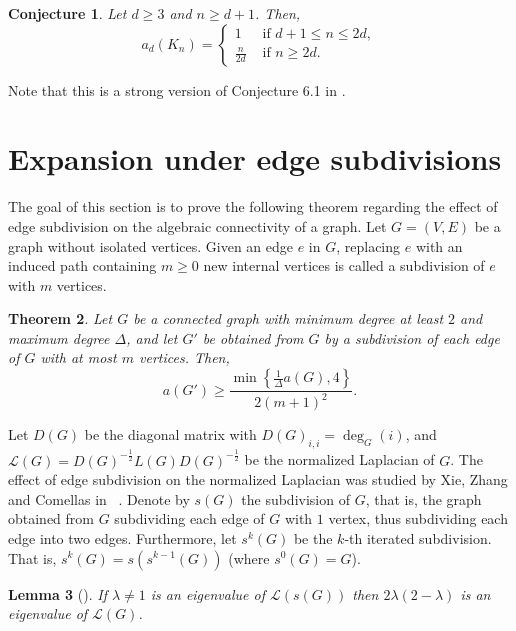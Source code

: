 \documentclass[a4paper,11pt]{article}
\theoremstyle{plain}
\newtheorem{theorem}{\bf Theorem}[section]
\newtheorem{conjecture}[theorem]{\bf Conjecture}
\newtheorem{lemma}[theorem]{\bf Lemma}
\theoremstyle{definition}
\begin{document}
\begin{conjecture}\label{conj:complete}
Let $d\geq 3$ and $n\geq d+1$. Then,
\[
a_d(K_n)=\begin{cases}
1 & \text{ if }  d+1\leq n\leq 2d,\\
\frac{n}{2d} & \text{ if } n\geq 2d.
\end{cases}
\]
\end{conjecture}
Note that this is a strong version of Conjecture 6.1 in \cite{lew2022d}.






\section{Expansion under edge subdivisions}\label{sec:subdivisions}
The goal of this section is to prove the following theorem regarding the effect of edge subdivision on the algebraic connectivity of a graph. Let $G=(V,E)$ be a graph without isolated vertices. Given an edge $e$ in  $G$, replacing $e$ with an induced path containing $m\ge 0$ new internal vertices is called a subdivision of $e$ with $m$ vertices. 

\begin{theorem}\label{thm:subdivided_spectral_gap}
Let $G$ be a connected graph with minimum degree at least $2$ and maximum degree $\Delta$, and let $G'$ be obtained from $G$ by a subdivision of each edge of $G$ with at most $m$ vertices. Then,
\[
a(G')\geq \frac{\min\left\{\frac{1}{\Delta}a(G),4\right\}}{2 (m+1)^2}.
\]
\end{theorem}


 Let $D(G)$ be the diagonal matrix with $D(G)_{i,i}=\deg_G(i)$, and $\mathcal{L}(G)=D(G)^{-\frac{1}{2}} L(G) D(G)^{-\frac{1}{2}}$ be the normalized Laplacian of $G$.  
 The effect of edge subdivision on the normalized Laplacian was studied by Xie, Zhang and Comellas in ~\cite{xie2016normalized}. Denote by $s(G)$ the subdivision of $G$, that is, the graph obtained from $G$ subdividing each edge of $G$ with $1$ vertex, thus subdividing each edge into two edges. Furthermore, let $s^k(G)$ be the $k$-th iterated subdivision. That is, $s^k(G)=s(s^{k-1}(G))$ (where  $s^{0}(G)=G$).


\begin{lemma}[{\cite[Lemma 3.1]{xie2016normalized}}]\label{lemma:normalized_subdivision}
If $\lambda\neq 1$ is an eigenvalue of $\mathcal{L}(s(G))$ then $2\lambda(2-\lambda)$ is an eigenvalue of $\mathcal{L}(G)$.
\end{lemma}
\end{document}
